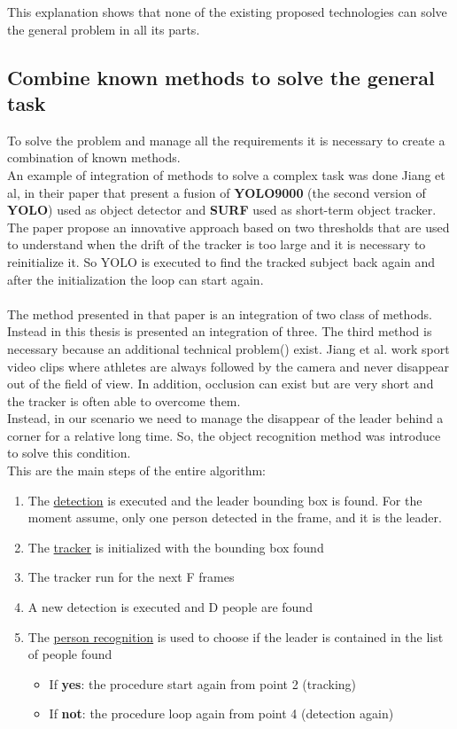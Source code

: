 This explanation shows that none of the existing proposed technologies can solve the general problem in all its parts.

\subsection{Combine known methods to solve the general task}
To solve the problem and manage all the requirements it is necessary to create a combination of known methods.\\
An example of integration of methods to solve a complex task was done Jiang et al, in their paper\cite{multi-feature-fusion-and-YOLO} that present a fusion of \textbf{YOLO9000}\cite{yoloV2} (the second version of \textbf{YOLO}\cite{yolo}) used as object detector and \textbf{SURF}\cite{surf} used as short-term object tracker.\\
The paper propose an innovative approach based on two thresholds that are used to understand when the drift of the tracker is too large and it is necessary to reinitialize it. So YOLO is executed to find the tracked subject back again and after the initialization the loop can start again.\\
\\
The method presented in that paper is an integration of two class of methods. Instead in this thesis is presented an integration of three. The third method is necessary because an additional technical problem() exist. Jiang et al. work sport video clips where athletes are always followed by the camera and never disappear out of the field of view. In addition, occlusion can exist but are very short and the tracker is often able to overcome them.\\
Instead, in our scenario we need  to manage the disappear of the leader behind a corner for a relative long time. So, the object recognition method was introduce to solve this condition.\\ 
This are the main steps of the entire algorithm:
\begin{enumerate}
	\item The \underline{detection} is executed and the leader bounding box is found. For the moment assume, only one person detected in the frame, and it is the leader.
	\item The \underline{tracker} is initialized with the bounding box found
	\item The tracker run for the next F frames
	\item A new detection is executed and D people are found
	\item The \underline{person recognition} is used to choose if the leader is contained in the list of people found
	\begin{itemize}
		\item If \textbf{yes}: the procedure start again from point 2 (tracking)
		\item If \textbf{not}: the procedure loop again from point 4 (detection again)
	\end{itemize}
\end{enumerate}

